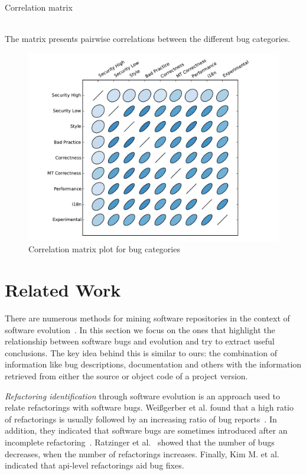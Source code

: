 \documentclass[conference]{llncs}
\begin{document}
\begin{table}[t]
    \centering
    \caption{Correlation matrix}
    \label{tbl:corrmatrix}
    
    \\
    \small The matrix presents pairwise correlations between the
        different bug categories.
\end{table}


\begin{figure}[t]
  \centering
  \includegraphics[scale=0.6]{corrplot.pdf}
  \caption{Correlation matrix plot for bug categories}
  \label{fig:corrplot}
\end{figure}

\section{Related Work}
\label{sec:rel}

There are numerous methods for mining software repositories in the context
of software evolution~\cite{KCM07}. In this section we focus on the ones
that highlight the relationship between software bugs and evolution and try to
extract useful conclusions. The key idea behind this is
similar to ours: the combination of information like bug descriptions,
documentation and others with the information retrieved from either the source
or object code of a project version.

{\it Refactoring identification} through software evolution is an approach used to
relate refactorings with software bugs. Wei{\ss}gerber et al. found that a high
ratio of refactorings is usually followed by an increasing ratio of bug
reports~\cite{WD06}. In addition, they indicated that software bugs are sometimes introduced
after an incomplete refactoring~\cite{GW05}.
Ratzinger et al.~\cite{RSG08} showed that the number of bugs decreases, when the number of
refactorings increases. Finally, Kim M. et al.~\cite{KCK11} indicated that {\sc api}-level
refactorings aid bug fixes.
\end{document}
